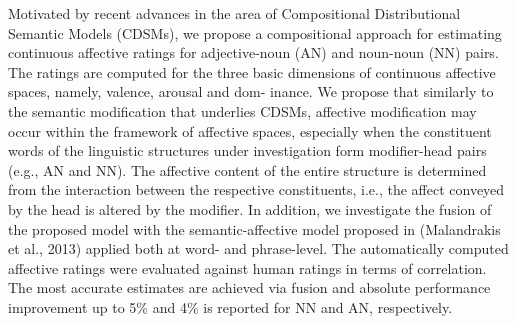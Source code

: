 Motivated by recent advances in the area of Compositional Distributional Semantic Models (CDSMs), we propose a compositional approach for estimating continuous affective ratings for adjective-noun (AN) and noun-noun (NN) pairs. The ratings are computed for the three basic dimensions of continuous affective spaces, namely, valence, arousal and dom- inance. We propose that similarly to the semantic modification that underlies CDSMs, affective modification may occur within the framework of affective spaces, especially when the constituent words of the linguistic structures under investigation form modifier-head pairs (e.g., AN and NN). The affective content of the entire structure is determined from the interaction between the respective constituents, i.e., the affect conveyed by the head is altered by the modifier. In addition, we investigate the fusion of the proposed model with the semantic-affective model proposed in (Malandrakis et al., 2013) applied both at word- and phrase-level. The automatically computed affective ratings were evaluated against human ratings in terms of correlation. The most accurate estimates are achieved via fusion and absolute performance improvement up to 5\% and 4\% is reported for NN and AN, respectively.
